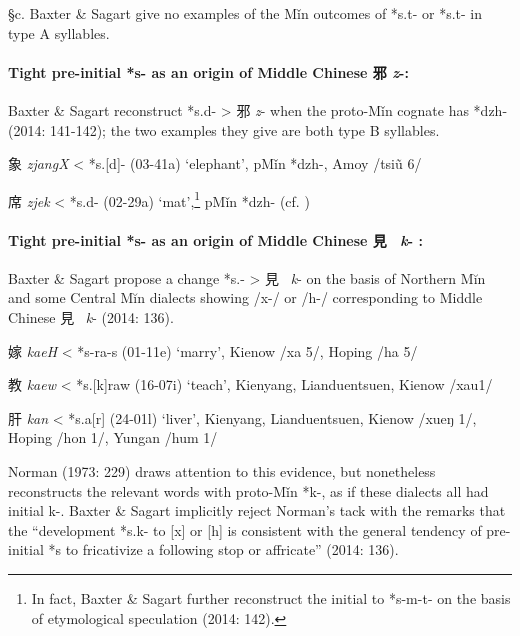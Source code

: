 §c. Baxter \& Sagart give no examples of the Mǐn outcomes of *s.t{}- or
*s.t{}{}- in type A syllables.

\paragraph{Tight pre-initial *s- as an origin
of Middle Chinese 邪 \emph{z}-:} 
\label{par:tight-pre-initial-s-for-MC-z-3}
Baxter \& Sagart
reconstruct *s.d- \textgreater{} 邪  \emph{z}- when the proto-Mǐn cognate
has *dzh- (2014: 141-142); the two examples they give are both type B
syllables.

\begin{description} \item
象  \emph{zjangX} \textless{} *s.{[}d]- (03-41a) `elephant', pMǐn
*dzh-, Amoy /ts{}iũ 6/
\item 
席  \emph{zjek} \textless{} *s.d- (02-29a) `mat',\footnote{In fact,
  Baxter \& Sagart further reconstruct the initial to *s-m-t- on the
  basis of etymological speculation (2014: 142).} pMǐn *dzh- (cf. 
  \cite[389 note 63]{Baxter2014OldChinese})
\end{description}

\paragraph{Tight pre-initial *s- as an origin
of Middle Chinese 見~ \emph{k}{-} :} 
Baxter \& Sagart propose a change *s.{}- \textgreater{} 見~ \emph{k}-
on the basis of Northern Mĭn and some Central Mĭn dialects showing /x-/
or /h-/ corresponding to Middle Chinese 見~ \emph{k}- (2014: 136).

\begin{description} \item
嫁  \emph{kaeH} \textless{} *s-{}ra-s (01-11e) `marry', Kienow /xa 5/,
Hoping /ha 5/
\item
教  \emph{kaew} \textless{} *s.{[}k]{}raw (16-07i) `teach', Kienyang,
Lianduentsuen, Kienow /xau1/

\item
肝  \emph{kan} \textless{} *s.{}a{[}r] (24-01l) `liver', Kienyang,
Lianduentsuen, Kienow /xueŋ 1/, Hoping /hon 1/, Yungan /hum 1/
\end{description}

Norman (1973: 229) draws attention to this evidence, but nonetheless
reconstructs the relevant words with proto-Mǐn *k-, as if these dialects
all had initial k-. Baxter \& Sagart implicitly reject Norman's tack
with the remarks that the ``development *s.k- to {[}x] or {[}h] is
consistent with the general tendency of pre-initial *s to fricativize a
following stop or affricate'' (2014: 136).

